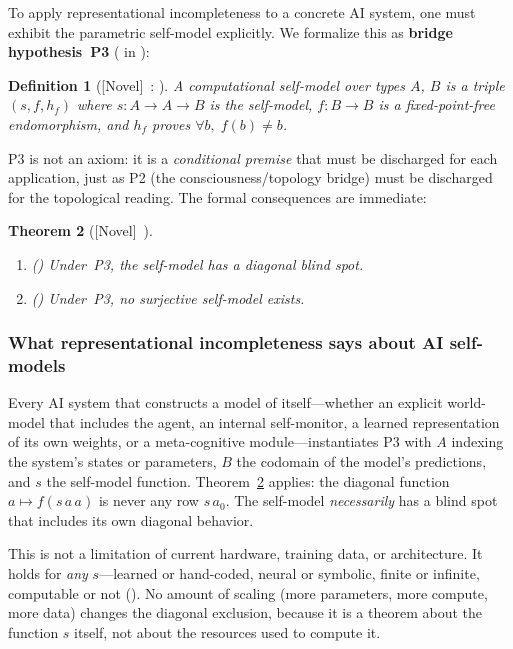 \documentclass[11pt]{article}
\newtheorem{theorem}{Theorem}[section]
\newtheorem{definition}[theorem]{Definition}
\newcommand{\novel}{\textcolor{blue!70!black}{[Novel]}}
\begin{document}
To apply representational incompleteness to a concrete AI system, one
must exhibit the parametric self-model explicitly.  We formalize this
as \textbf{bridge hypothesis~P3}
( in ):

\begin{definition}[\novel\ :
  ]
\label{def:p3}
A \emph{computational self-model} over types $A$, $B$ is a triple
$(s, f, h_f)$ where $s : A \to A \to B$ is the self-model,
$f : B \to B$ is a fixed-point-free endomorphism, and $h_f$ proves
$\forall b,\; f(b) \neq b$.
\end{definition}

\noindent
P3 is not an axiom: it is a \emph{conditional premise} that must be
discharged for each application, just as P2 (the consciousness/topology
bridge) must be discharged for the topological reading.  The formal
consequences are immediate:

\begin{theorem}[\novel\ ]
\label{thm:p3}
\leavevmode
\begin{enumerate}[label=(\alph*)]
\item ()
  Under~P3, the self-model has a diagonal blind spot.
\item ()
  Under~P3, no surjective self-model exists.
\end{enumerate}
\end{theorem}

\subsubsection{What representational incompleteness says about AI self-models}

Every AI system that constructs a model of itself---whether an
explicit world-model that includes the agent, an internal self-monitor,
a learned representation of its own weights, or a meta-cognitive
module---instantiates P3 with $A$ indexing the system's states or
parameters, $B$ the codomain of the model's predictions, and $s$ the
self-model function.  Theorem~\ref{thm:p3} applies:
the diagonal function $a \mapsto f(s\,a\,a)$ is never any row $s\,a_0$.
The self-model \emph{necessarily} has a blind spot that includes its own
diagonal behavior.

This is not a limitation of current hardware, training data, or
architecture.  It holds for \emph{any} $s$---learned or hand-coded,
neural or symbolic, finite or infinite, computable or not
().  No amount
of scaling (more parameters, more compute, more data) changes the
diagonal exclusion, because it is a theorem about the function $s$
itself, not about the resources used to compute it.
\end{document}
